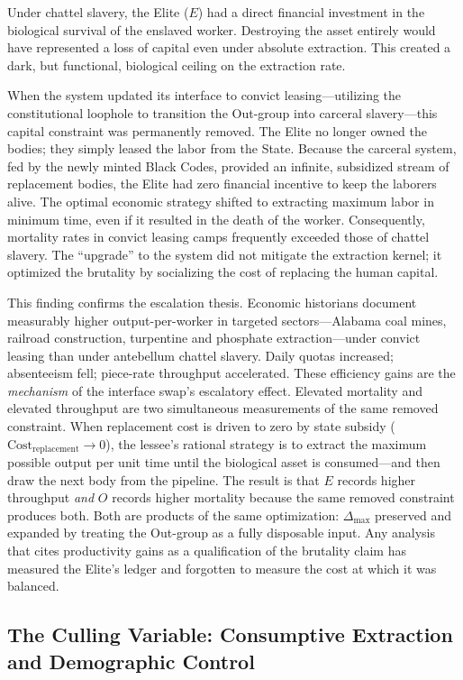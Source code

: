 Under chattel slavery, the Elite ($E$) had a direct financial investment in the biological survival of the enslaved worker. Destroying the asset entirely would have represented a loss of capital even under absolute extraction. This created a dark, but functional, biological ceiling on the extraction rate.

When the system updated its interface to convict leasing---utilizing the constitutional loophole to transition the Out-group into carceral slavery---this capital constraint was permanently removed. The Elite no longer owned the bodies; they simply leased the labor from the State. Because the carceral system, fed by the newly minted Black Codes, provided an infinite, subsidized stream of replacement bodies, the Elite had zero financial incentive to keep the laborers alive. The optimal economic strategy shifted to extracting maximum labor in minimum time, even if it resulted in the death of the worker. Consequently, mortality rates in convict leasing camps frequently exceeded those of chattel slavery. The ``upgrade'' to the system did not mitigate the extraction kernel; it optimized the brutality by socializing the cost of replacing the human capital.

This finding confirms the escalation thesis. Economic historians document measurably higher output-per-worker in targeted sectors---Alabama coal mines, railroad construction, turpentine and phosphate extraction---under convict leasing than under antebellum chattel slavery. Daily quotas increased; absenteeism fell; piece-rate throughput accelerated. These efficiency gains are the \textit{mechanism} of the interface swap's escalatory effect. Elevated mortality and elevated throughput are two simultaneous measurements of the same removed constraint. When replacement cost is driven to zero by state subsidy ($\text{Cost}_{\text{replacement}} \to 0$), the lessee's rational strategy is to extract the maximum possible output per unit time until the biological asset is consumed---and then draw the next body from the pipeline. The result is that $E$ records higher throughput \textit{and} $O$ records higher mortality because the same removed constraint produces both. Both are products of the same optimization: $\Delta_{\max}$ preserved and expanded by treating the Out-group as a fully disposable input. Any analysis that cites productivity gains as a qualification of the brutality claim has measured the Elite's ledger and forgotten to measure the cost at which it was balanced.

\subsection{The Culling Variable: Consumptive Extraction and Demographic Control}


